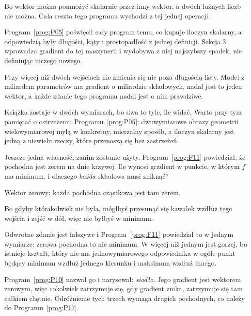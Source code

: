 \begin{fr}
\begin{ansblock}
Bo wektor można pomnożyć skalarnie przez inny wektor, a dwóch luźnych liczb
nie można. Cała reszta tego programu wychodzi z tej jednej operacji.
\end{ansblock}

Program~\ref{prog:P05} poświęcił cały program temu, co kupuje iloczyn
skalarny, a odpowiedzią były długości, kąty i prostopadłość z jednej
definicji. Sekcja 3 wprowadza gradient do tej maszynerii i wydobywa z niej
najszybszy spadek, nie definiując niczego nowego.

\begin{note}
Przy więcej niż dwóch wejściach nie zmienia się nic poza długością listy.
Model z miliardem parametrów ma gradient o miliardzie składowych, nadal jest
to jeden wektor, a każde zdanie tego programu nadal jest o nim prawdziwe.

Książka zostaje w dwóch wymiarach, bo dwa to tyle, ile widać. Warto przy tym
pamiętać o ostrzeżeniu Programu~\ref{prog:P05}: dwuwymiarowe obrazy geometrii
wielowymiarowej mylą w konkretny, mierzalny sposób, a iloczyn skalarny jest
jedną z niewielu rzeczy, które przenoszą się bez zastrzeżeń.
\end{note}
\end{fr}

\begin{fr}
Jeszcze jedna własność, zanim zostanie użyty. Program~\ref{prog:F11}
powiedział, że pochodna jest zerem na dnie krzywej. Ile wynosi gradient w
punkcie, w którym $f$ ma minimum, i dlaczego \emph{każda} składowa musi
zniknąć?
\nextframe
\end{fr}

\begin{fr}
\begin{ansblock}
Wektor zerowy: każda pochodna cząstkowa jest tam zerem.
\end{ansblock}

Bo gdyby którakolwiek nie była, mógłbyś przesunąć się kawałek wzdłuż tego
wejścia i zejść w dół, więc nie byłbyś w minimum.

\begin{trapbox}
Odwrotne zdanie jest fałszywe i Program~\ref{prog:F11} powiedział to w jednym
wymiarze: zerowa pochodna to nie minimum. W więcej niż jednym jest gorzej, bo
istnieje kształt, który nie ma jednowymiarowego odpowiednika w ogóle \dash{}
punkt będący minimum wzdłuż jednego kierunku i maksimum wzdłuż innego.

Program~\ref{prog:P10} nazwał go i narysował: \emph{siodło}. Jego gradient
jest wektorem zerowym, więc cokolwiek zatrzymuje się, gdy gradient znika,
zatrzymuje się tam całkiem chętnie. Odróżnienie tych trzech wymaga drugich
pochodnych, co należy do Programu~\ref{prog:P17}.
\end{trapbox}
\end{fr}

